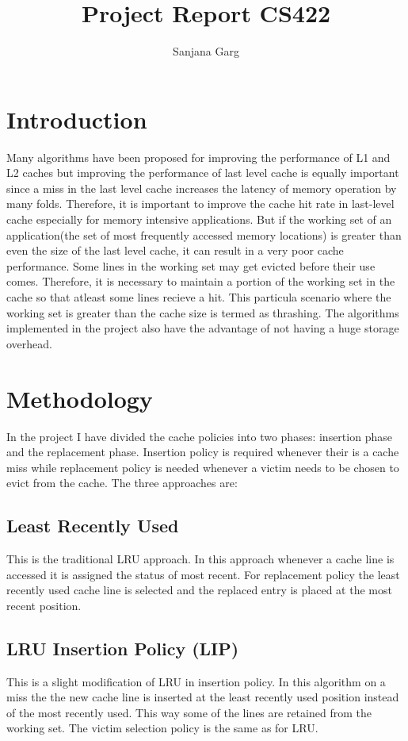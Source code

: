 \documentclass{article}
\title{Project Report CS422}
\author{Sanjana Garg}
\date{}
\begin{document}
\maketitle

\section{Introduction}
Many algorithms have been proposed for improving the performance of L1 and L2 caches but improving the performance of last level cache is equally important since a miss in the last level cache increases the latency of memory operation by many folds. Therefore, it is important to improve the cache hit rate in last-level cache especially for memory intensive applications. But if the working set of an application(the set of most frequently accessed memory locations) is greater than even the size of the last level cache, it can result in a very poor cache performance. Some lines in the working set may get evicted before their use comes. Therefore, it is necessary to maintain a portion of the working set in the cache so that atleast some lines recieve a hit. This particula scenario where the working set is greater than the cache size is termed as thrashing. The algorithms implemented in the project also have the advantage of not having a huge storage overhead.

\section{Methodology}
In the project I have divided the cache policies into two phases: insertion phase and the replacement phase. Insertion policy is required whenever their is a cache miss while replacement policy is needed whenever a victim needs to be chosen to evict from the cache. The three approaches are:
\subsection{Least Recently Used}
This is the traditional LRU approach. In this approach whenever a cache line is accessed it is assigned the status of  most recent. For replacement policy the least recently used cache line is selected and the replaced entry is placed at the most recent position.

\subsection{LRU  Insertion Policy (LIP)}
This is a slight modification of LRU in insertion policy. In this algorithm on a miss the the new cache line is inserted at the least recently used position instead of the most recently used. This way some of the lines are retained from the working set. The victim selection policy is the same as for LRU.
\end{document}
